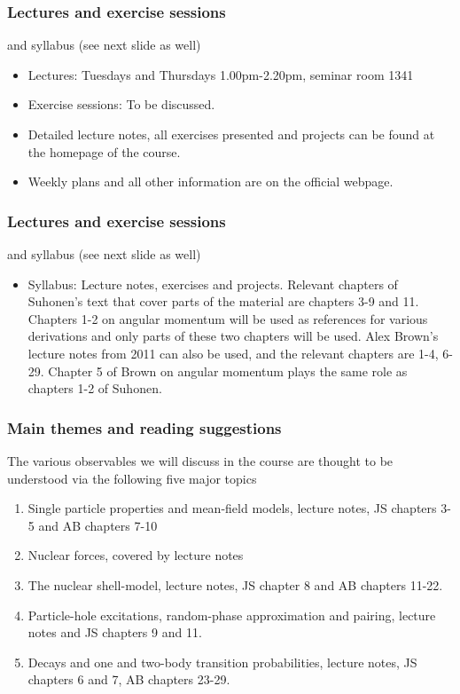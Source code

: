\documentclass[compress]{beamer}
\begin{document}
\frame
{
  \frametitle{Lectures and exercise sessions}
  \begin{block}{and syllabus (see next slide as well)}
\begin{itemize}
\item Lectures: Tuesdays and Thursdays 1.00pm-2.20pm, seminar room 1341
\item Exercise sessions:  To be discussed.
       \item Detailed lecture notes, all exercises presented and projects
can be found at the homepage of the course.
       \item Weekly plans and all other information are on the official webpage.
\end{itemize}
  \end{block}
}


\frame
{
  \frametitle{Lectures and exercise sessions}
  \begin{block}{and syllabus (see next slide as well)}
\begin{itemize}
\item Syllabus: Lecture notes, exercises and projects. Relevant chapters of Suhonen's text that cover parts of the material are chapters 3-9 and 11. Chapters 1-2 on angular momentum will be used as references for various derivations and only parts of these two chapters will be used. Alex Brown's lecture notes from 2011 can also be used, and the relevant chapters are 1-4, 6-29. Chapter 5 of Brown on angular momentum plays the same role as chapters 1-2 of Suhonen. 
\end{itemize}
  \end{block}
}



\frame
{
  \frametitle{Main themes and reading suggestions}
\begin{small}
{\scriptsize
The various observables we will discuss in the course are thought to be understood via the following five 
major topics
\begin{enumerate}
\item Single  particle properties and mean-field models, lecture notes, JS chapters 3-5 and AB chapters 7-10
\item Nuclear forces, covered by lecture notes
\item The nuclear shell-model, lecture notes, JS chapter 8 and AB chapters 11-22.
\item Particle-hole excitations, random-phase approximation and pairing, lecture notes and JS chapters 9 and 11.
\item Decays and one and two-body transition probabilities, lecture notes, JS chapters 6 and 7, AB chapters 23-29.
\end{enumerate}
}
\end{small}
}
\end{document}
